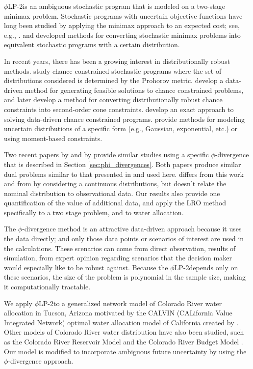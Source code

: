 \documentclass[ijoc,nonblindrev]{informs3} %
\newcommand{\plp}{$\phi$LP-2}
\begin{document}
\plp is an ambiguous stochastic program that is modeled on a two-stage minimax problem.
Stochastic programs with uncertain objective functions have long been studied by applying the minimax approach to an expected cost; see, e.g., \cite{dupacova_87}.
\cite{shapiro2002minimax} and \cite{shapiro2004class} developed methods for converting stochastic minimax problems into equivalent stochastic programs with a certain distribution.

In recent years, there has been a growing interest in distributionally robust methods.
\cite{erdogan2006ambiguous} study chance-constrained stochastic programs where the set of distributions considered is determined by the Prohorov metric.
\cite{calafiore2005uncertain} develop a data-driven method for generating feasible solutions to chance constrained problems, and later \cite{calafiore2006distributionally} develop a method for converting distributionally robust chance constraints into second-order cone constraints.
\cite{jiang2012data} develop an exact approach to solving data-driven chance constrained programs.
\cite{delage_ye_10} provide methods for modeling uncertain distributions of a specific form (e.g., Gaussian, exponential, etc.) or using moment-based constraints.

Two recent papers by \cite{wang2010likelihood} and by \cite{hukullback} provide similar studies using a specific $\phi$-divergence that is described in Section \ref{sec:phi_divergences}.
Both papers produce similar dual problems similar to that presented in \cite{bental2011robust} and used here.
\cite{hukullback} differs from this work and from \cite{wang2010likelihood} by considering a continuous distributions, but doesn't relate the nominal distribution to observational data.
Our results also provide one quantification of the value of additional data, and apply the LRO method specifically to a two stage problem, and to water allocation.

The $\phi$-divergence method is an attractive data-driven approach because it uses the data directly; and only those data points or scenarios of interest are used in the calculations.
These scenarios can come from direct observation, results of simulation, from expert opinion regarding scenarios that the decision maker would especially like to be robust against.
Because the \plp depends only on these scenarios, the size of the problem is polynomial in the sample size, making it computationally tractable.

We apply \plp to a generalized network model of Colorado River water allocation in Tucson, Arizona motivated by the CALVIN (CALifornia Value Integrated Network) optimal water allocation model of California created by \cite{draper_etal_03}.
Other models of Colorado River water distribution have also been studied, such as the Colorado River Reservoir Model \cite{christensen2004effects} and the Colorado River Budget Model \cite{barnett2009sustainable}.
Our model is modified to incorporate ambiguous future uncertainty by using the $\phi$-divergence approach.
\end{document}
